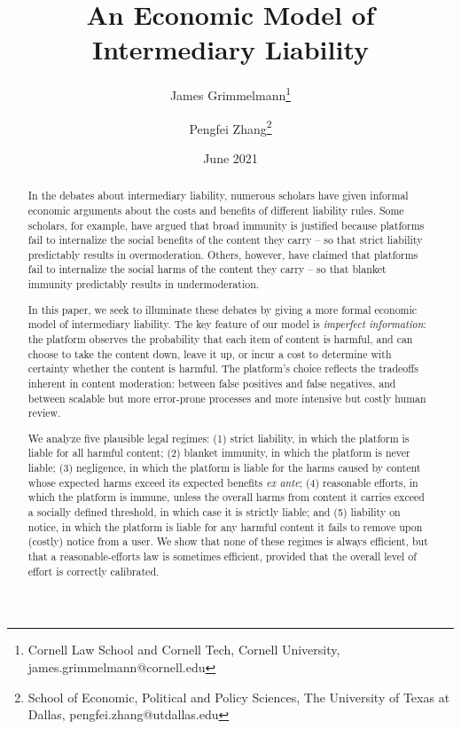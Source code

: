 \documentclass[openbib,12pt]{article}  %
\title{An Economic Model of Intermediary Liability}
\author{James Grimmelmann\footnote{Cornell Law School and Cornell Tech, Cornell University, james.grimmelmann@cornell.edu}
\and Pengfei Zhang\footnote{School of Economic, Political and Policy Sciences, The University of Texas at Dallas, pengfei.zhang@utdallas.edu}}
\date{June 2021}
\begin{document}
\maketitle
\begin{abstract}
\noindent 
In the debates about intermediary liability, numerous scholars have given informal economic arguments about the costs and benefits of different liability rules. Some scholars, for example, have argued that broad immunity is justified because platforms fail to internalize the social benefits of the content they carry -- so that strict liability predictably results in overmoderation. Others, however, have claimed that platforms fail to internalize the social harms of the content they carry -- so that blanket immunity predictably results in undermoderation.

In this paper, we seek to illuminate these debates by giving a more formal economic model of intermediary liability. The key feature of our model is \emph{imperfect information}: the platform observes the probability that each item of content is harmful, and can choose to take the content down, leave it up, or incur a cost to determine with certainty whether the content is harmful. The platform's choice reflects the tradeoffs inherent in content moderation: between false positives and false negatives, and between scalable but more error-prone processes and more intensive but costly human review.

We analyze five plausible legal regimes: (1) strict liability, in which the platform is liable for all harmful content; (2) blanket immunity, in which the platform is never liable; (3) negligence, in which the platform is liable for the harms caused by content whose expected harms exceed its expected benefits \emph{ex ante}; (4) reasonable efforts, in which the platform is immune, unless the overall harms from content it carries exceed a socially defined threshold, in which case it is strictly liable; and (5) liability on notice, in which the platform is liable for any harmful content it fails to remove upon (costly) notice from a user. We show that none of these regimes is always efficient, but that a reasonable-efforts law is sometimes efficient, provided that the overall level of effort is correctly calibrated.


\end{abstract}
\end{document}
